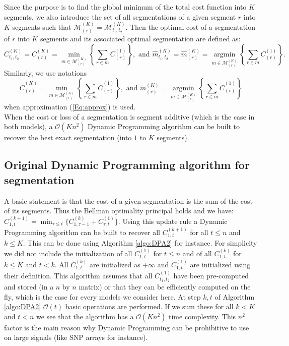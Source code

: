 \documentclass{llncs}
\begin{document}
Since the purpose is to find the global minimum of the total cost function into $K$ segments, we also introduce the set of all segmentations of a given segment $r$ into $K$ segments such that $\mathcal{M}^{(K)}_{(r)} = \mathcal{M}^{(K)}_{t_1, t_2}$. Then the optimal cost of a segmentation of $r$ into $K$ segments and its associated optimal segmentation are defined as:
$$
C_{t_1, t_2}^{(K)} = C_{(r)}^{(K)} = \min_{m \in \mathcal{M}^{(K)}_{(r)}} \left\{ \sum_{r \in m} C^{(1)}_{(r)} \right\}, 
\text{ and }
\widehat{m}_{t_1, t_2}^{(K)} = \widehat{m}_{(r)}^{(K)} = \underset{m \in \mathcal{M}^{(K)}_{(r)}}{\operatorname{argmin}} \left\{ \sum_{r \in m} C^{(1)}_{(r)} \right\}.
$$
Similarly, we use notations 
$$
\widetilde{C}_{(r)}^{(K)} =\min_{m \in \mathcal{M}^{(K)}_{(r)}} \left\{ \sum_{r \in m} \widetilde{C}^{(1)}_{(r)} \right\}, \text{ and }
\widetilde{m}_{(r)}^{(K)} = \underset{m \in \mathcal{M}^{(K)}_{(r)}}{\operatorname{argmin}} \left\{ \sum_{r \in m} \widetilde{C}^{(1)}_{(r)} \right\}
$$
when approximation (\ref{Eq:approx}) is used.\\

When the cost or loss of a segmentation is segment additive (which is the case in both models), a $\mathcal{O}(Kn^2)$ Dynamic Programming algorithm can be built to recover the best exact segmentation (into $1$ to $K$ segments).

\subsection{Original Dynamic Programming algorithm for segmentation}

A basic statement is that the cost of a given segmentation is the sum of the cost of its segments. Thus the Bellman optimality principal holds and we have: $ C_{1, t}^{(k+1)} = \min_{\tau \leq t} \{ C_{1, \tau -1}^{(k)}  + C_{\tau, t}^{(1)} \} .$
Using this update rule  a Dynamic Programming algorithm can be built to recover all $ C_{1, t}^{(k+1)}$ for all $t \leq n$ and $k \leq K$.
This can be done using Algorithm \ref{algo:DPA2} for instance. 
For simplicity we did not include the initialization of all $C^{(1)}_{1,t}$ for $t \leq n$ and of all $C^{(k)}_{1,t}$ for $k \leq K$ and $t < k$.
All $C^{(k)}_{1,t}$ are initialized as $+\infty$ and $C^{(1)}_{1,t}$ are initialized using their definition.
This algorithm assumes that all $C_{t_1, t_2}^{(1)}$ have been pre-computed and stored (in 
a $n$ by $n$ matrix) or that they can be efficiently computed on the fly, which is the case for every models we consider here. At step $k, t$ of Algorithm \ref{algo:DPA2}  $\mathcal{O}(t)$ basic operations are performed. If we sum these for all $k < K$ and $t < n$  we see that the algorithm has a $\mathcal{O}(Kn^2)$ time complexity. This $n^2$ factor is the main reason why Dynamic Programming can be prohibitive to use on large signals (like SNP arrays for instance).
\end{document}
